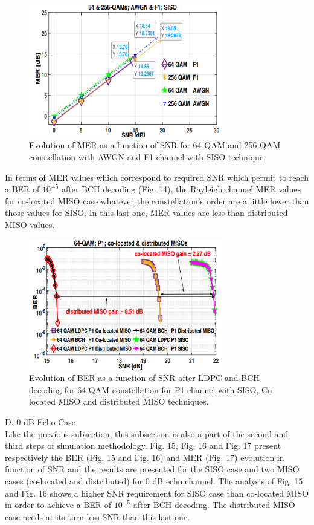 \documentclass[10pt, conference]{IEEEtran}
\begin{document}
 

\begin{figure}[!htbp]
\centering
    \includegraphics[width=8.5cm]{img1.png}
    \caption{ Evolution of MER as a function of SNR for 64-QAM and 256-QAM constellation with AWGN and F1 channel with SISO technique.}
\end{figure}
\linespread{1.1}
\normalsize{
In terms of MER values which correspond to required SNR which permit to reach a BER of $10^{-5}$ after BCH decoding (Fig. 14), the Rayleigh channel MER values for co-located MISO case whatever the constellation’s order are a little lower than those values for SISO. In this last one, MER values are less than distributed MISO values.


\begin{figure}[!htbp]
\centering
    \includegraphics[width=8.5cm]{img2.png}
    \caption{Evolution of BER as a function of SNR after LDPC and BCH decoding for 64-QAM constellation for P1 channel with SISO, Co-located MISO and distributed MISO techniques.}
\end{figure}


 D. 0 dB Echo Case\\
Like the previous subsection, this subsection is also a part of the second and third steps of simulation methodology. Fig. 15, Fig. 16 and Fig. 17 present respectively the BER (Fig. 15 and Fig. 16) and MER (Fig. 17) evolution in function of SNR and the results are presented for the SISO case and two MISO cases (co-located and distributed) for 0 dB echo channel. The analysis of Fig. 15 and Fig. 16 shows a higher SNR requirement for SISO case than co-located MISO in order to achieve a BER of $10^{-5}$ after BCH decoding. The distributed MISO case needs at its turn less SNR than this last one.
}
\end{document}
